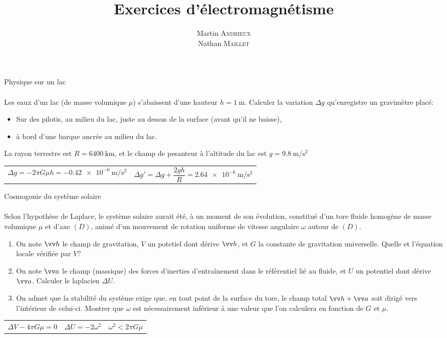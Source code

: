 \documentclass[french, a4paper, 11pt]{article}
\title{Exercices d'électromagnétisme}
\author{Martin \textsc{Andrieux} \\ Nathan \textsc{Maillet}}
\date{}
\begin{document}
\maketitle

\begin{cadre}{Physique sur un lac}
  \paragraph*{}
  Les eaux d'un lac (de masse volumique \(\mu\)) s'abaissent d'une hauteur \(h=\SI{1}{\meter}\). Calculer la variation \(\Delta g\) qu'enregistre un gravimètre placé:
  \begin{itemize}[label=\(\bullet\)]
    \item Sur des pilotis, au milieu du lac, juste au dessus de la surface (avant qu'il ne baisse),
    \item à bord d'une barque ancrée au milieu du lac.
  \end{itemize}
  La rayon terrestre est \(R=\SI{6400}{\kilo\meter}\), et le champ de pesanteur à l'altitude du lac est \(g=\SI{9,8}{\meter\per\square\second}\)
  \tcblower
  \begin{tabularx}{\linewidth}{Xr}
    \(\Delta g = -2\pi G\mu h = \SI{-0.42e-6}{\meter\per\square\second}\)&
    \(\Delta g' = \Delta g + \dfrac{2gh}{R} = \SI{2.64e-6}{\meter\per\square\second}\)
  \end{tabularx}
\end{cadre}

\begin{cadre}{Cosmogonie du système solaire}
  \paragraph*{}
  Selon l'hypothèse de Laplace, le système solaire aurait été, à un moment de son évolution, constitué d'un tore fluide homogène de masse volumique \(\mu\) et d'axe \((D)\), animé d'un mouvement de rotation uniforme de vitesse angulaire \(\omega\) autour de \((D)\).
  \begin{enumerate}[label=\upshape\alph*)]
    \item On note \(\vv h\) le champ de gravitation, \(V\) un potetiel dont dérive \(\vv h\), et \(G\) la constante de gravitation universelle. Quelle et l'équation locale vérifiée par \(V\)?
    \item On note \(\vv a\) le champ (massique) des forces d'inerties d'entraînement dans le référentiel lié au fluide, et \(U\) un potentiel dont dérive \(\vv a\). Calculer le laplacien \(\Delta U\).
    \item On admet que la stabilité du système exige que, en tout point de la surface du tore, le champ total \(\vv h + \vv a\) soit dirigé vers l'intérieur de celui-ci. Montrer que \(\omega\) est nécessairement inférieur à une valeur que l'on calculera en fonction de \(G\) et \(\mu\).
  \end{enumerate}
  \tcblower
  \begin{tabularx}{\linewidth}{XXr}
    \(\Delta V -4\pi G\mu = 0\) & \(\Delta U = -2\omega^{2}\) & \(\omega^{2} < 2\pi G \mu\)
  \end{tabularx}
\end{cadre}
\end{document}
